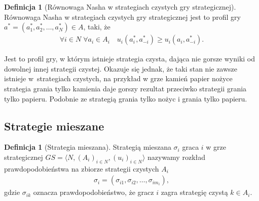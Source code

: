 \documentclass[inzynierska]{pwr_wmat_praca_dyplomowa}
\theoremstyle{plain}
\numberwithin{theorem}{chapter}
\theoremstyle{definition}
\numberwithin{theorem}{chapter}
\newtheorem{definition}[theorem]{Definicja}
\begin{document}
	\begin{definition}[Równowaga Nasha w strategiach czystych gry strategicznej]
		Równowaga Nasha w strategiach czystych gry strategicznej jest to profil gry $a^*= (a_1^*, a_2^*, \dots, a_N^*)\in A$, taki, że
		\begin{align*}
			\mathop{\forall}{i \in N}\;
			\mathop{\forall}{a_i \in A_i} \quad
			u_i(a_i^*, a_{-i}^*) \ge u_i(a_i, a_{-i}^*).
		\end{align*}
	\end{definition}
	\noindent
	Jest to profil gry, w którym istnieje strategia czysta, dająca nie gorsze wyniki od dowolnej innej strategii czystej.
	Okazuje się jednak, że taki stan nie zawsze istnieje w~strategiach czystych, na przykład w grze kamień papier nożyce strategia grania tylko kamienia daje gorszy rezultat przeciwko strategii grania tylko papieru. Podobnie ze strategią grania tylko nożyc i grania tylko papieru.
	\subsection{Strategie mieszane}
	\begin{definition}[Strategia mieszana]
		Strategią mieszana $\sigma_i$ graca $i$ w grze strategicznej $GS = \langle N, (A_i)_{i \in N}, (u_i)_{i \in N} \rangle $ nazywamy rozkład prawdopodobieństwa na zbiorze strategii czystych $A_i$
		\begin{align*}
			\sigma_i = (\sigma_{i1},  \sigma_{i2}, \dots, \sigma_{im_i}),
		\end{align*}
	gdzie $\sigma_{ik}$ oznacza prawdopodobieństwo, że gracz $i$ zagra strategię czystą $k\in A_i$.  
	\end{definition}
\end{document}
